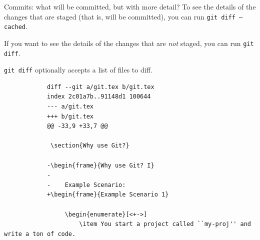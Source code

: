 \documentclass{beeper}
\begin{document}
\begin{frame}[fragile]{Commits: what will be committed, but with more detail?}
    To see the details of the changes that are staged (that is, will be
    committed), you can run \texttt{git diff --cached}.

    If you want to see the details of the changes that are \textit{not} staged,
    you can run \texttt{git diff}.

    \texttt{git diff} optionally accepts a list of files to diff.
    \pause

    {
        \tiny
        \begin{verbatim}
            diff --git a/git.tex b/git.tex
            index 2c01a7b..91148d1 100644
            --- a/git.tex
            +++ b/git.tex
            @@ -33,9 +33,7 @@

             \section{Why use Git?}

            -\begin{frame}{Why use Git? I}
            -
            -    Example Scenario:
            +\begin{frame}{Example Scenario 1}

                 \begin{enumerate}[<+->]
                     \item You start a project called ``my-proj'' and write a ton of code.
        \end{verbatim}
    }
\end{frame}
\end{document}
